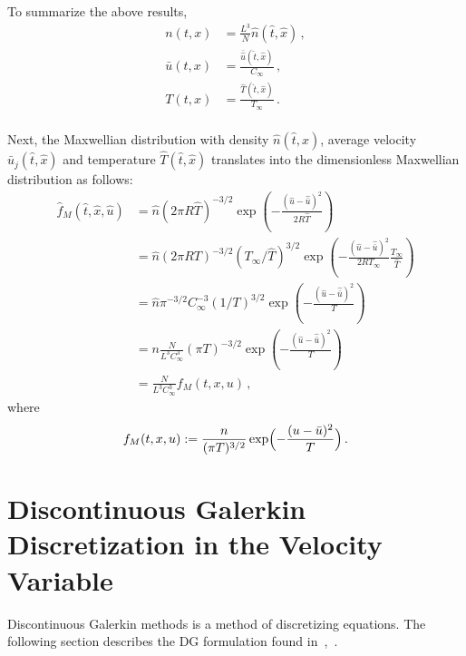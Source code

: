 \documentclass[12pt]{CSUNthesis}
\newcommand{\Tref}{T_{\infty}}
\newcommand{\Cref}{C_{\infty}}
\begin{document}
To summarize the above results,
\begin{equation}
\begin{split}
n(t,x)&=\frac{L^3 }{N} \hat{n}(\hat{t},\hat{x})\, , \nonumber  \\
\bar{u}(t,x)&=\frac{\bar{\hat{u}}(\hat{t},\hat{x})}{\Cref}\, , \nonumber \\ 
T(t,x) &= \frac{\hat{T}(\hat{t},\hat{x})}{T_{\infty}} \, . \\
\end{split}
\end{equation}

Next, the Maxwellian distribution with density $\hat{n}(\hat{t},\hat{x})$, average velocity 
$\hat{\bar{u}}_{j}(\hat{t},\hat{x})$ and temperature $\hat{T}(\hat{t},\hat{x})$ translates 
into the dimensionless Maxwellian distribution as follows:
\begin{equation}
\begin{split}
\hat{f}_{M}(\hat{t},\hat{x},\hat{u}) &= \hat{n}(2\pi R\hat{T})^{-3/2} \exp \left(- \frac{(\hat{u}-\hat{\bar{u}})^2}{2R\hat{T}}\right) \\
&= \hat{n}(2 \pi R T)^{-3/2}(\Tref / \hat{T}) ^{3/2} \exp \left(- \frac{(\hat{u}-\hat{\bar{u}})^2}{2R \Tref}\frac{\Tref}{\hat{T}}\right)\\
&= \hat{n}\pi^{-3/2} \Cref^{-3} (1/T) ^{3/2} \exp \left(- \frac{(\hat{u}-\hat{\bar{u}})^2}{T}\right)\\
&= n \frac{N}{L^3 \Cref^3} (\pi T)^{-3/2} \exp \left(- \frac{(\hat{u}-\hat{\bar{u}})^2}{T}\right)\\
&=\frac{N}{L^3 C^3_{\infty}} f_{M}(t,x,u)\, ,
\end{split}
\end{equation}
where 
\begin{equation}
f_{M}(t,x,u) :=  \frac{n}{(\pi T)^{3/2}} \exp\Bigl(-\frac{(u-\bar{u})^2}{T} \Bigr )\, . 
\end{equation}


\chapter{Discontinuous Galerkin Discretization in the Velocity Variable}

Discontinuous Galerkin methods is a method of discretizing equations. The following section describes the DG formulation found in~\cite{AlekseenkoJosyula2012},~\cite{AlekseenkoNguyenWood2015}.
\end{document}
